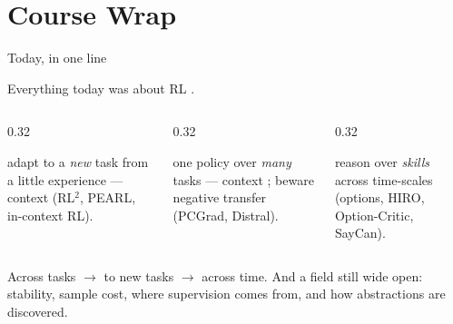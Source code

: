 \section{Course Wrap}

\begin{frame}{Today, in one line}
\begin{center}\large
Everything today was about RL .
\end{center}
\vspace{0.8em}
\begin{columns}[t]
\begin{column}{0.32\textwidth}
\begin{tcolorbox}[colback=sysblue!20, colframe=sysblue!70!black, title=\textbf{Meta-RL}]
\footnotesize adapt to a \emph{new} task from a little experience --- context
 (RL$^2$, PEARL, in-context RL).
\end{tcolorbox}
\end{column}
\begin{column}{0.32\textwidth}
\begin{tcolorbox}[colback=mlgreen!20, colframe=mlgreen!60!black, title=\textbf{Multi-task RL}]
\footnotesize one policy over \emph{many} tasks --- context ; beware negative
transfer (PCGrad, Distral).
\end{tcolorbox}
\end{column}
\begin{column}{0.32\textwidth}
\begin{tcolorbox}[colback=boxtan!30, colframe=boxtan!80!black, title=\textbf{Hierarchical RL}]
\footnotesize reason over \emph{skills} across time-scales (options, HIRO, Option-Critic,
SayCan).
\end{tcolorbox}
\end{column}
\end{columns}
\vfill
\begin{center}\footnotesize
Across tasks \; $\rightarrow$ \; to new tasks \; $\rightarrow$ \; across time. \quad And a
field still wide open: stability, sample cost, where supervision comes from, and how
abstractions are discovered.
\end{center}
\end{frame}

